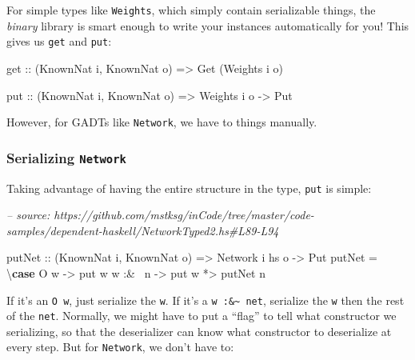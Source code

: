 \documentclass[]{article}
\newenvironment{Shaded}{}{}
\newcommand{\CommentTok}[1]{\textcolor[rgb]{0.38,0.63,0.69}{\textit{#1}}}
\newcommand{\DataTypeTok}[1]{\textcolor[rgb]{0.56,0.13,0.00}{#1}}
\newcommand{\FunctionTok}[1]{\textcolor[rgb]{0.02,0.16,0.49}{#1}}
\newcommand{\KeywordTok}[1]{\textcolor[rgb]{0.00,0.44,0.13}{\textbf{#1}}}
\newcommand{\NormalTok}[1]{#1}
\newcommand{\OtherTok}[1]{\textcolor[rgb]{0.00,0.44,0.13}{#1}}
\begin{document}
For simple types like \texttt{Weights}, which simply contain serializable
things, the \emph{binary} library is smart enough to write your instances
automatically for you! This gives us \texttt{get} and \texttt{put}:

\begin{Shaded}
\begin{Highlighting}[]
\OtherTok{get ::}\NormalTok{ (}\DataTypeTok{KnownNat}\NormalTok{ i, }\DataTypeTok{KnownNat}\NormalTok{ o)}
    \OtherTok{=>} \DataTypeTok{Get}\NormalTok{ (}\DataTypeTok{Weights}\NormalTok{ i o)}

\OtherTok{put ::}\NormalTok{ (}\DataTypeTok{KnownNat}\NormalTok{ i, }\DataTypeTok{KnownNat}\NormalTok{ o)}
    \OtherTok{=>} \DataTypeTok{Weights}\NormalTok{ i o}
    \OtherTok{->} \DataTypeTok{Put}
\end{Highlighting}
\end{Shaded}

However, for GADTs like \texttt{Network}, we have to things manually.

\hypertarget{serializing-network}{%
\subsubsection{\texorpdfstring{Serializing
\texttt{Network}}{Serializing Network}}\label{serializing-network}}

Taking advantage of having the entire structure in the type, \texttt{put} is
simple:

\begin{Shaded}
\begin{Highlighting}[]
\CommentTok{-- source: https://github.com/mstksg/inCode/tree/master/code-samples/dependent-haskell/NetworkTyped2.hs#L89-L94}

\OtherTok{putNet ::}\NormalTok{ (}\DataTypeTok{KnownNat}\NormalTok{ i, }\DataTypeTok{KnownNat}\NormalTok{ o)}
       \OtherTok{=>} \DataTypeTok{Network}\NormalTok{ i hs o}
       \OtherTok{->} \DataTypeTok{Put}
\NormalTok{putNet }\FunctionTok{=}\NormalTok{ \textbackslash{}}\KeywordTok{case}
    \DataTypeTok{O}\NormalTok{ w     }\OtherTok{->}\NormalTok{ put w}
\NormalTok{    w }\FunctionTok{:&~}\NormalTok{ n }\OtherTok{->}\NormalTok{ put w }\FunctionTok{*>}\NormalTok{ putNet n}
\end{Highlighting}
\end{Shaded}

If it's an \texttt{O\ w}, just serialize the \texttt{w}. If it's a
\texttt{w\ :\&\textasciitilde{}\ net}, serialize the \texttt{w} then the rest of
the \texttt{net}. Normally, we might have to put a ``flag'' to tell what
constructor we serializing, so that the deserializer can know what constructor
to deserialize at every step. But for \texttt{Network}, we don't have to:
\end{document}

